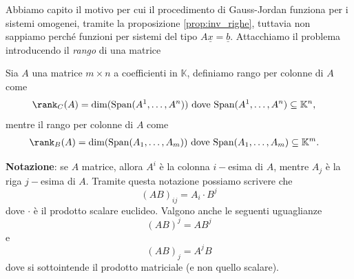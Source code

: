 Abbiamo capito il motivo per cui il procedimento di Gauss-Jordan funziona per i sistemi omogenei, tramite la proposizione \ref{prop:inv_righe}, tuttavia non sappiamo perché funzioni per sistemi del tipo $A\underline{x} = \underline{b}$. Attacchiamo il problema introducendo il \emph{rango} di una matrice
\begin{definition}
  Sia $A$ una matrice $m \times n$ a coefficienti in $\mathbb{K}$, definiamo rango per colonne di $A$ come
  \begin{align}
    &\rank_C{(A)} = \text{dim}(\text{Span}(A^1, \ldots, A^n)) \text{ dove } \text{Span}(A^1, \ldots, A^n) \subseteq \mathbb{K}^n,
  \end{align}
  mentre il rango per colonne di $A$ come
  \begin{align}
    &\rank_B{(A)} = \text{dim}(\text{Span}(A_1, \ldots, A_m)) \text{ dove } \text{Span}(A_1, \ldots, A_m) \subseteq \mathbb{K}^m.
  \end{align}
\end{definition}
\textbf{Notazione}: se $A$ matrice, allora $A^i$ è la colonna $i-$esima di $A$, mentre $A_j$ è la riga $j-$esima di $A$. Tramite questa notazione possiamo scrivere che
$$
  (AB)_{ij} = A_i \cdot B^j
$$
dove $\cdot$ è il prodotto scalare euclideo. Valgono anche le seguenti uguaglianze
$$
  (AB)^j = AB^j
$$
e
$$
  (AB)_j = A^j B
$$
dove si sottointende il prodotto matriciale (e non quello scalare).

